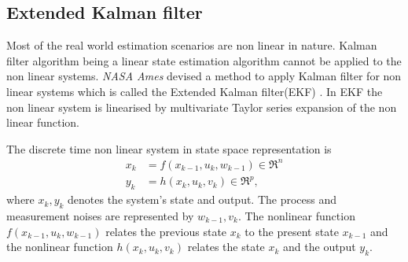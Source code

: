 \subsection{Extended Kalman filter}
\label{subsec:ekf}
Most of the real world estimation scenarios are non linear in nature. Kalman filter algorithm  being a linear state estimation algorithm cannot be applied to the non linear systems. \emph{NASA Ames} devised a method to apply Kalman filter for non linear systems which is called the Extended Kalman filter(EKF) \citep{ekf85}. In EKF the non linear system is linearised by multivariate Taylor series expansion of the non linear function. 

The discrete time non linear system in state space representation is
\begin{equation}
\label{eq:nl_disc}
\begin{split}
x_{k} &= f(x_{k-1},u_k,w_{k-1}) \in \Re^{n}\\
y_k &= h(x_k,u_k,v_k) \in \Re^{p},
\end{split}
\end{equation}
where $x_k,y_k$ denotes the system's state and output. The process and measurement noises are represented by $w_{k-1},v_k$. The nonlinear function $f(x_{k-1},u_k,w_{k-1})$ relates the previous state $x_k$ to the present state $x_{k-1}$ and the nonlinear function $h(x_k,u_k,v_k)$ relates the state $x_k$ and the output $y_k$. 

